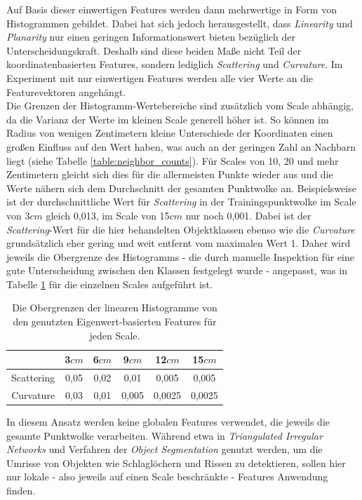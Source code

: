 Auf Basis dieser einwertigen Features werden dann mehrwertige in Form von Histogrammen gebildet. Dabei hat sich jedoch herausgestellt, dass \textit{Linearity} und \textit{Planarity} nur einen geringen Informationswert bieten bezüglich der Unterscheidungskraft. Deshalb sind diese beiden Maße nicht Teil der koordinatenbasierten Features, sondern lediglich \textit{Scattering} und \textit{Curvature}. Im Experiment mit nur einwertigen Features werden alle vier Werte an die Featurevektoren angehängt. \\
Die Grenzen der Histogramm-Wertebereiche sind zusätzlich vom Scale abhängig, da die Varianz der Werte im kleinen Scale generell höher ist. So können im Radius von wenigen Zentimetern kleine Unterschiede der Koordinaten einen großen Einfluss auf den Wert haben, was auch an der geringen Zahl an Nachbarn liegt (siehe Tabelle \ref{table:neighbor_counts}). Für Scales von 10, 20 und mehr Zentimetern gleicht sich dies für die allermeisten Punkte wieder aus und die Werte nähern sich dem Durchschnitt der gesamten Punktwolke an. Beispielsweise ist der durchschnittliche Wert für \textit{Scattering} in der Trainingspunktwolke im Scale von 3$cm$ gleich 0,013, im Scale von 15$cm$ nur noch 0,001. Dabei ist der \textit{Scattering}-Wert für die hier behandelten Objektklassen ebenso wie die \textit{Curvature} grundsätzlich eher gering und weit entfernt vom maximalen Wert 1. Daher wird jeweils die Obergrenze des Histogramms - die durch manuelle Inspektion für eine gute Unterscheidung zwischen den Klassen festgelegt wurde - angepasst, was in Tabelle \ref{table:eigenvalue_features_impl} für die einzelnen Scales aufgeführt ist.

\begin{table}
\centering
\begin{tabular}{c|c|c|c|c|c}
& 3$cm$ & 6$cm$ & 9$cm$ & 12$cm$ & 15$cm$ \\
\hline
Scattering & 0,05 & 0,02 & 0,01 & 0,005 & 0,005 \\
Curvature  & 0,03 & 0,01 & 0,005 & 0,0025 & 0,0025 \\
\end{tabular}
\caption{Die Obergrenzen der linearen Histogramme von den genutzten Eigenwert-basierten Features für jeden Scale.}
\label{table:eigenvalue_features_impl}
\end{table}

In diesem Ansatz werden keine globalen Features verwendet, die jeweils die gesamte Punktwolke verarbeiten. Während etwa in \cite{Zhiqiang.etal-2019} \textit{Triangulated Irregular Networks} und Verfahren der \textit{Object Segmentation} genutzt werden, um die Umrisse von Objekten wie Schlaglöchern und Rissen zu detektieren, sollen hier nur lokale - also jeweils auf einen Scale beschränkte - Features Anwendung finden.